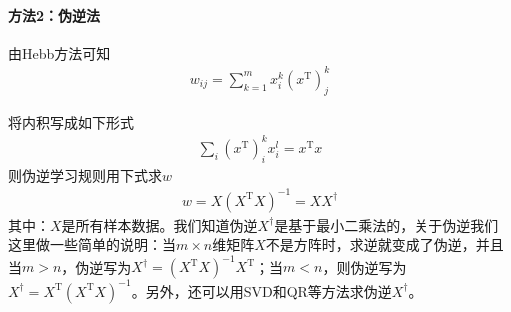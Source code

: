             \paragraph{方法2：伪逆法}由Hebb方法可知
            \begin{align*}
            w_{ij} = \sum_{k=1}^mx_i^k(x^\mathrm{T})_j^k
            \end{align*}
            \par
            将内积写成如下形式
            \begin{align*}
            \sum_i (x^\mathrm{T})_i^k x_i^l = x^\mathrm{T}x
            \end{align*}
            则伪逆学习规则用下式求$w$
            \begin{align*}
            w = X(X^\mathrm{T}X)^{-1} = X X^{\dag}
            \end{align*}
            其中：$X$是所有样本数据。我们知道伪逆$X^\dag$是基于最小二乘法的，关于伪逆我们这里做一些简单的说明：当$m\times n$维矩阵$X$不是方阵时，求逆就变成了伪逆，并且当$m>n$，伪逆写为$X^\dag = (X^\mathrm{T}X)^{-1}X^\mathrm{T}$；当$m<n$，则伪逆写为$X^\dag = X^\mathrm{T}(X^\mathrm{T}X)^{-1}$。另外，还可以用SVD和QR等方法求伪逆$X^\dag$。
